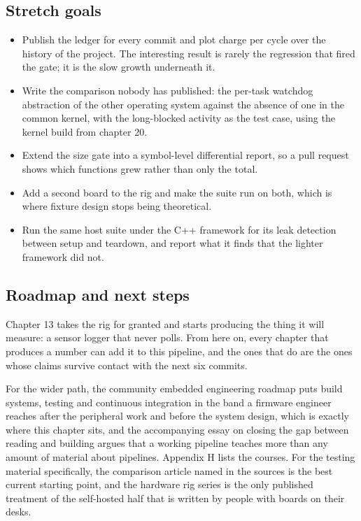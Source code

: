 \subsection*{Stretch goals}

\begin{itemize}
\item Publish the ledger for every commit and plot charge per cycle over the
history of the project. The interesting result is rarely the regression that
fired the gate; it is the slow growth underneath it.
\item Write the comparison nobody has published: the per-task watchdog
abstraction of the other operating system against the absence of one in the
common kernel, with the long-blocked activity as the test case, using the
kernel build from chapter 20.
\item Extend the size gate into a symbol-level differential report, so a pull
request shows which functions grew rather than only the total.
\item Add a second board to the rig and make the suite run on both, which is
where fixture design stops being theoretical.
\item Run the same host suite under the C++ framework for its leak detection
between setup and teardown, and report what it finds that the lighter framework
did not.
\end{itemize}

\subsection*{Roadmap and next steps}

Chapter 13 takes the rig for granted and starts producing the thing it will
measure: a sensor logger that never polls. From here on, every chapter that
produces a number can add it to this pipeline, and the ones that do are the ones
whose claims survive contact with the next six commits.

For the wider path, the community embedded engineering roadmap puts build
systems, testing and continuous integration in the band a firmware engineer
reaches after the peripheral work and before the system design, which is exactly
where this chapter sits, and the accompanying essay on closing the gap between
reading and building argues that a working pipeline teaches more than any amount
of material about pipelines. Appendix H lists the courses. For the testing
material specifically, the comparison article named in the sources is the best
current starting point, and the hardware rig series is the only published
treatment of the self-hosted half that is written by people with boards on their
desks.

